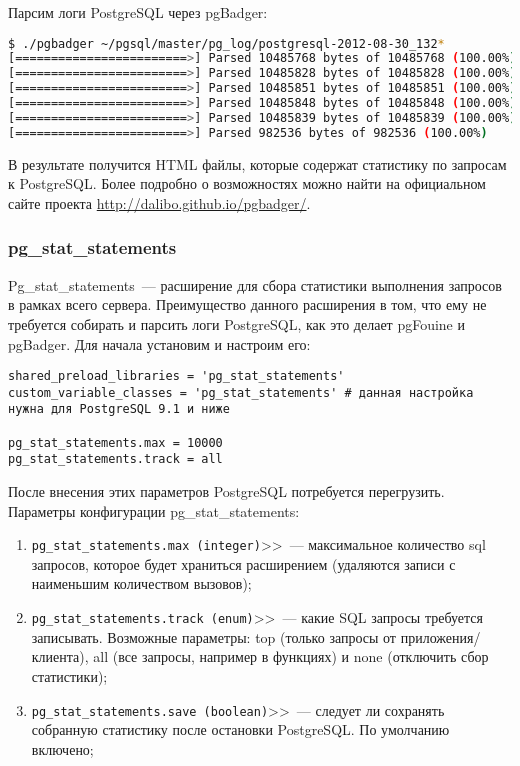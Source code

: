 Парсим логи PostgreSQL через pgBadger:

\begin{lstlisting}[language=Bash,label=lst:sql_performance11,caption=Запуск pgBadger]
$ ./pgbadger ~/pgsql/master/pg_log/postgresql-2012-08-30_132*
[========================>] Parsed 10485768 bytes of 10485768 (100.00%)
[========================>] Parsed 10485828 bytes of 10485828 (100.00%)
[========================>] Parsed 10485851 bytes of 10485851 (100.00%)
[========================>] Parsed 10485848 bytes of 10485848 (100.00%)
[========================>] Parsed 10485839 bytes of 10485839 (100.00%)
[========================>] Parsed 982536 bytes of 982536 (100.00%)
\end{lstlisting}

В результате получится HTML файлы, которые содержат статистику по запросам к PostgreSQL. Более подробно о возможностях можно найти на официальном сайте проекта \href{http://dalibo.github.io/pgbadger/}{http://dalibo.github.io/pgbadger/}.

\subsubsection{pg\_stat\_statements}

Pg\_stat\_statements~--- расширение для сбора статистики выполнения запросов в рамках всего сервера. Преимущество данного расширения в том, что ему не требуется собирать и парсить логи PostgreSQL, как это делает pgFouine и pgBadger. Для начала установим и настроим его:

\begin{lstlisting}[label=lst:sql_performance12,caption=Настройка pg\_stat\_statements в postgresql.conf]
shared_preload_libraries = 'pg_stat_statements'
custom_variable_classes = 'pg_stat_statements' # данная настройка нужна для PostgreSQL 9.1 и ниже

pg_stat_statements.max = 10000
pg_stat_statements.track = all
\end{lstlisting}

После внесения этих параметров PostgreSQL потребуется перегрузить. Параметры конфигурации pg\_stat\_statements:

\begin{enumerate}
  \item \lstinline!pg_stat_statements.max (integer)!>>~--- максимальное количество sql запросов, которое будет храниться расширением (удаляются записи с наименьшим количеством вызовов);
  \item \lstinline!pg_stat_statements.track (enum)!>>~--- какие SQL запросы требуется записывать. Возможные параметры: top (только запросы от приложения/клиента), all (все запросы, например в функциях) и none (отключить сбор статистики);
  \item \lstinline!pg_stat_statements.save (boolean)!>>~--- следует ли сохранять собранную статистику после остановки PostgreSQL. По умолчанию включено;
\end{enumerate}


